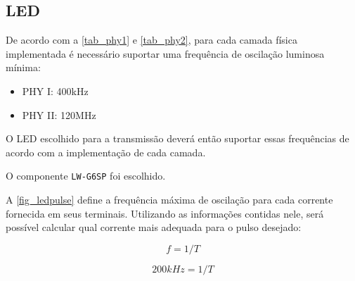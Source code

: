 	\subsection{LED}\label{hard-led}
	
	De acordo com a \autoref{tab_phy1} e \autoref{tab_phy2}, para cada camada física implementada é necessário suportar uma frequência de oscilação luminosa mínima:
	
	\begin{itemize}
		\item PHY I: 400kHz
		\item PHY II: 120MHz
	\end{itemize} 
	
	O LED escolhido para a transmissão deverá então suportar essas frequências de acordo com a implementação de cada camada. 
	
	O componente \texttt{LW-G6SP} foi escolhido.
	
	A \autoref{fig_ledpulse} define a frequência máxima de oscilação para cada corrente fornecida em seus terminais. Utilizando as informações contidas nele, será possível calcular qual corrente mais adequada para o pulso desejado:
	
	\begin{equation} \label{eq:5}
		f = 1 / T
	\end{equation}
	
	\begin{equation}
	200kHz = 1 / T
	\end{equation}
	
